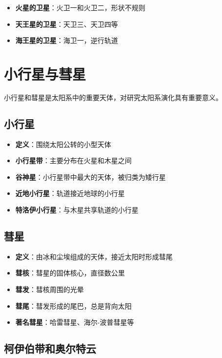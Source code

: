 \documentclass[12pt,UTF8]{ctexbook}
\begin{document}
\begin{itemize}
  \item \textbf{火星的卫星}：火卫一和火卫二，形状不规则
  \item \textbf{天王星的卫星}：天卫三、天卫四等
  \item \textbf{海王星的卫星}：海卫一，逆行轨道
\end{itemize}

\section{小行星与彗星}

小行星和彗星是太阳系中的重要天体，对研究太阳系演化具有重要意义。

\subsection{小行星}

\begin{itemize}
  \item \textbf{定义}：围绕太阳公转的小型天体
  \item \textbf{小行星带}：主要分布在火星和木星之间
  \item \textbf{谷神星}：小行星带中最大的天体，被归类为矮行星
  \item \textbf{近地小行星}：轨道接近地球的小行星
  \item \textbf{特洛伊小行星}：与木星共享轨道的小行星
\end{itemize}

\subsection{彗星}

\begin{itemize}
  \item \textbf{定义}：由冰和尘埃组成的天体，接近太阳时形成彗尾
  \item \textbf{彗核}：彗星的固体核心，直径数公里
  \item \textbf{彗发}：彗核周围的光晕
  \item \textbf{彗尾}：彗发形成的尾巴，总是背向太阳
  \item \textbf{著名彗星}：哈雷彗星、海尔-波普彗星等
\end{itemize}

\subsection{柯伊伯带和奥尔特云}
\end{document}
